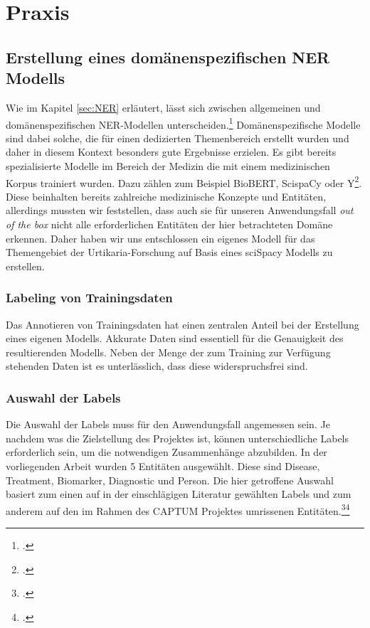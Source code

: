 \newpage
\section{Praxis} \label{sec:Praxis}
\subsection{Erstellung eines domänenspezifischen NER Modells}\label{sec:ErstellungNerModell}
Wie im Kapitel \ref{sec:NER} erläutert, lässt sich zwischen allgemeinen und domänenspezifischen \ac{NER}-Modellen unterscheiden.\footcite[vgl.][S.47]{nouvel2016} Domänenspezifische Modelle sind dabei solche, die für einen dedizierten Themenbereich erstellt wurden und daher in diesem Kontext besonders gute Ergebnisse erzielen.
Es gibt bereits spezialisierte Modelle im Bereich der Medizin die mit einem medizinischen Korpus trainiert wurden. Dazu zählen zum Beispiel BioBERT, ScispaCy oder Y\footcite[S.12]{li2020}. Diese beinhalten bereits zahlreiche medizinische Konzepte und Entitäten, allerdings mussten wir feststellen, dass auch sie für unseren Anwendungsfall \textit{out of the box} nicht alle erforderlichen Entitäten der hier betrachteten Domäne erkennen. Daher haben wir uns entschlossen ein eigenes Modell für das Themengebiet der Urtikaria-Forschung auf Basis eines sciSpacy Modells zu erstellen.
\subsubsection{Labeling von Trainingsdaten}\label{sec:Labeling}
Das Annotieren von Trainingsdaten hat einen zentralen Anteil bei der Erstellung eines eigenen Modells. Akkurate Daten sind essentiell für die Genauigkeit des resultierenden Modells. Neben der Menge der zum Training zur Verfügung stehenden Daten ist es unterlässlich, dass diese widerspruchsfrei sind.

\subsubsection{Auswahl der Labels}\label{sec:AuswahlLabels}
Die Auswahl der Labels muss für den Anwendungsfall angemessen sein. Je nachdem was die Zielstellung des Projektes ist, können unterschiedliche Labels erforderlich sein, um die notwendigen Zusammenhänge abzubilden.
In der vorliegenden Arbeit wurden 5 Entitäten ausgewählt. Diese sind Disease, Treatment, Biomarker, Diagnostic und Person. Die hier getroffene Auswahl basiert zum einen auf in der einschlägigen Literatur gewählten Labels und zum anderem auf den im Rahmen des CAPTUM Projektes umrissenen Entitäten.\footcite[vgl.][S.]{li2016}\footcite[vgl.][S.]{eickhoff2020}

